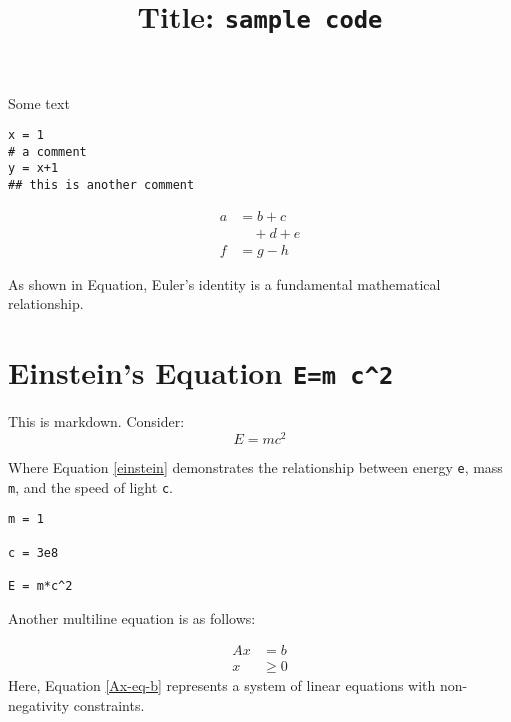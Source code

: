 \documentclass{article}
\title{Title: \texttt{sample code}}
\begin{document}
\maketitle


Some text 

\begin{verbatim}
x = 1
# a comment
y = x+1
## this is another comment
\end{verbatim}


\begin{equation*}
\begin{aligned}
  a &= b + c \\
  & \quad + d + e \\
  f &= g - h
\end{aligned}
\end{equation*}



As shown in Equation, Euler's identity is a fundamental mathematical relationship.
\section{Einstein's Equation \texttt{E=m c\textasciicircum{}2}}
This is markdown. Consider: 
\begin{equation}\label{einstein}
E = mc^2
\end{equation}

Where Equation \eqref{einstein} demonstrates the relationship between energy \texttt{e}, mass \texttt{m}, and the speed of light \texttt{c}.

\begin{verbatim}
m = 1

c = 3e8

E = m*c^2
\end{verbatim}


Another multiline equation is as follows: 

\begin{equation}\label{Ax-eq-b}
\begin{aligned}
  Ax &= b \\
  x &\ge 0
\end{aligned}
\end{equation}
Here, Equation \eqref{Ax-eq-b} represents a system of linear equations with non-negativity constraints.
\end{document}
